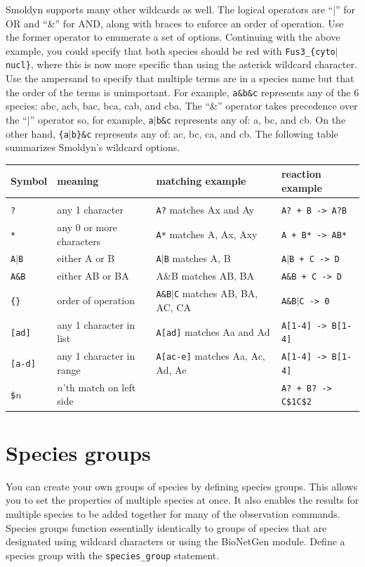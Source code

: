 \documentclass {scrbook}
\newcommand {\ttt} {\texttt}
\begin{document}
Smoldyn supports many other wildcards as well. The logical operators are ``$|$'' for OR and ``\&'' for AND, along with braces to enforce an order of operation. Use the former operator to enumerate a set of options. Continuing with the above example, you could specify that both species should be red with \ttt{Fus3\_\{cyto$|$nucl\}}, where this is now more specific than using the asterisk wildcard character. Use the ampersand to specify that multiple terms are in a species name but that the order of the terms is unimportant. For example, \ttt{a\&b\&c} represents any of the 6 species: abc, acb, bac, bca, cab, and cba. The ``\&'' operator takes precedence over the ``$|$'' operator so, for example, \ttt{a$|$b\&c} represents any of: a, bc, and cb. On the other hand, \ttt{\{a$|$b\}\&c} represents any of: ac, bc, ca, and cb. The following table summarizes Smoldyn's wildcard options.

\begin{longtable}[c]{llll}
Symbol & meaning & matching example & reaction example\\
\hline \\
\ttt{?} & any 1 character & \ttt{A?} matches Ax and Ay & \ttt{A? + B -> A?B}\\
\ttt{*} & any 0 or more characters & \ttt{A*} matches A, Ax, Axy & \ttt{A + B* -> AB*}\\
\ttt{A$|$B} & either A or B & \ttt{A$|$B} matches A, B & \ttt{A$|$B + C -> D}\\
\ttt{A\&B} & either AB or BA & A\&B matches AB, BA & \ttt{A\&B + C -> D}\\
\ttt{\{\}} & order of operation & \ttt{A\&{B$|$C}} matches AB, BA, AC, CA & \ttt{A\&{B$|$C} -> 0}\\
\ttt{[ad]} & any 1 character in list & \ttt{A[ad]} matches Aa and Ad & \ttt{A[1-4] -> B[1-4]}\\
\ttt{[a-d]} & any 1 character in range & \ttt{A[ac-e]} matches Aa, Ac, Ad, Ae & \ttt{A[1-4] -> B[1-4]}\\
\ttt{\$}$n$ & $n$'th match on left side &  & \ttt{A? + B? -> C\$1C\$2}
\end{longtable}

\section{Species groups}

You can create your own groups of species by defining species groups. This allows you to set the properties of multiple species at once. It also enables the results for multiple species to be added together for many of the observation commands. Species groups function essentially identically to groups of species that are designated using wildcard characters or using the BioNetGen module. Define a species group with the \ttt{species\_group} statement.
\end{document}
